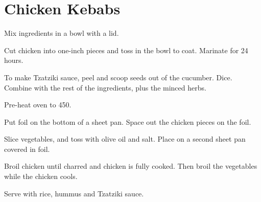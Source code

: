 \section{Chicken Kebabs}
\begin{recipe}



Mix ingredients in a bowl with a lid. 


Cut chicken into one-inch pieces and toss in the bowl to coat. 
Marinate for 24 hours.


To make Tzatziki sauce, peel and scoop seeds out of the cucumber. Dice. 
Combine with the rest of the ingredients, plus the minced herbs. 

Pre-heat oven to 450\degree{}.

Put foil on the bottom of a sheet pan. 
Space out the chicken pieces on the foil. 


Slice vegetables, and toss with olive oil and salt. 
Place on a second sheet pan covered in foil.

Broil chicken until charred and chicken is fully cooked. 
Then broil the vegetables while the chicken cools.

Serve with rice, hummus and Tzatziki sauce.

\end{recipe}

